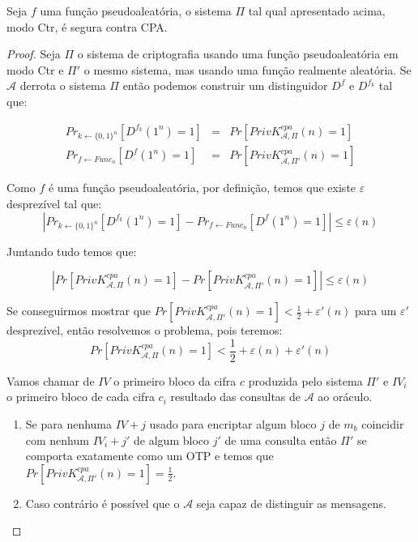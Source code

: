 \begin{theorem}
  Seja $f$ uma função pseudoaleatória, o sistema $\Pi$ tal qual apresentado acima, modo Ctr, é segura contra CPA.
\end{theorem}
\begin{proof}
  Seja $\Pi$ o sistema de criptografia usando uma função pseudoaleatória em modo Ctr e $\Pi'$ o mesmo sistema, mas usando uma função realmente aleatória.
Se $\mathcal{A}$ derrota o sistema $\Pi$ então podemos construir um distinguidor $D^{f}$ e $D^{f_k}$ tal que:


\begin{eqnarray*}
  Pr_{k \leftarrow \{0,1\}^n}[D^{f_k}(1^n) = 1] & = & Pr[PrivK^{cpa}_{\mathcal{A},\Pi}(n) = 1]\\
  Pr_{f \leftarrow Func_n}[D^{f}(1^n) = 1] & = & Pr[PrivK^{cpa}_{\mathcal{A},\Pi'}(n) = 1]
\end{eqnarray*}
 
Como $f$ é uma função pseudoaleatória, por definição, temos que existe $\varepsilon$ desprezível tal que:
\begin{displaymath}
  |Pr_{k \leftarrow \{0,1\}^n}[D^{f_k}(1^n) = 1] - Pr_{f \leftarrow Func_n}[D^{f}(1^n) = 1]| \leq \varepsilon(n)
\end{displaymath}

Juntando tudo temos que:

\begin{displaymath}
  |Pr[PrivK^{cpa}_{\mathcal{A},\Pi}(n) = 1] - Pr[PrivK^{cpa}_{\mathcal{A},\Pi'}(n) = 1]| \leq \varepsilon(n)
\end{displaymath}

Se conseguirmos mostrar que $Pr[PrivK^{cpa}_{\mathcal{A},\Pi'}(n) = 1] < \frac{1}{2} + \varepsilon'(n)$ para um $\varepsilon'$ desprezível, então resolvemos o problema, pois teremos:
\begin{displaymath}
  Pr[PrivK^{cpa}_{\mathcal{A},\Pi}(n) = 1] < \frac{1}{2} + \varepsilon(n) + \varepsilon'(n)
\end{displaymath}

Vamos chamar de $IV$ o primeiro bloco da cifra $c$ produzida pelo sistema $\Pi'$ e $IV_i$ o primeiro bloco de cada cifra $c_i$ resultado das consultas de $\mathcal{A}$ ao oráculo.
\begin{enumerate}
\item Se para nenhuma $IV + j$ usado para encriptar algum bloco $j$ de $m_b$ coincidir com nenhum $IV_i + j'$ de algum bloco $j'$ de uma consulta então $\Pi'$ se comporta exatamente como um OTP e temos que $Pr[PrivK^{cpa}_{\mathcal{A},\Pi'}(n) = 1] = \frac{1}{2}$.
\item Caso contrário é possível que o $\mathcal{A}$ seja capaz de distinguir as mensagens.
\end{enumerate}


\end{proof}
